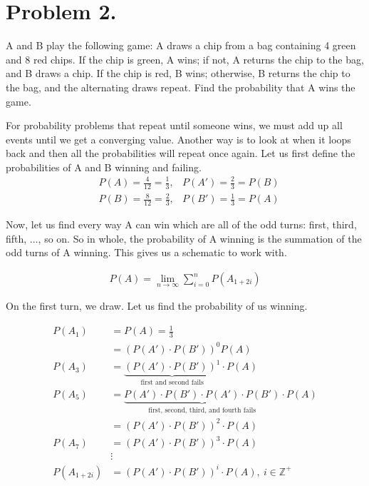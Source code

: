 \section{Problem 2.}

A and B play the following game:  A draws a chip from a bag containing 4 green and 8 red chips.  
If the chip is green, A wins; if not, A returns the chip to the bag, and B draws a chip.  
If the chip is red, B wins; otherwise, B returns the chip to the bag, and the alternating draws repeat.
Find the probability that A wins the game.

\begin{solution}
For probability problems that repeat until someone wins, we must add up all 
events until we get a converging value. Another way is to look at when it loops
back and then all the probabilities will repeat once again. Let us first define
the probabilities of A and B winning and failing.
\begin{align*}
    & P(A) = \frac{4}{12} = \frac{1}{3}, & P(A') = \frac{2}{3} = P(B) \\
    & P(B) = \frac{8}{12} = \frac{2}{3}, & P(B') = \frac{1}{3} = P(A)
\end{align*}

Now, let us find every way A can win which are all of the odd turns: first, third,
fifth, $\dots$, so on. So in whole, the probability of A winning is the summation 
of the odd turns of A winning. This gives us a schematic to work with.

\begin{align*}
    P(A) = \lim_{n \to \infty} \sum_{i=0}^{n} P(A_{1+2i})
\end{align*}

On the first turn, we draw. Let us find the probability of us winning.

\begin{align*}
    P(A_{1}) &= P(A) = \frac{1}{3} \\ 
             &= \left(P(A') \cdot P(B')\right)^{0} P(A) \\
    P(A_{3}) &= \underbrace{\left(P(A') \cdot P(B')\right)^{1}}_{\text{first and second fails}} \cdot P(A) \\
    P(A_{5}) &= \underbrace{P(A') \cdot P(B') \cdot P(A') \cdot P(B')}_{\text{first, second, third, and fourth fails}} \cdot P(A) \\
             &= \left(P(A') \cdot P(B')\right)^{2} \cdot P(A) \\
    P(A_{7}) &= \left(P(A') \cdot P(B')\right)^{3} \cdot P(A) \\
    & \vdots \\
    P(A_{1+2i}) &= \left(P(A') \cdot P(B')\right)^{i} \cdot P(A), \ i \in \mathbb{Z}^{+}
\end{align*}


\end{solution}
